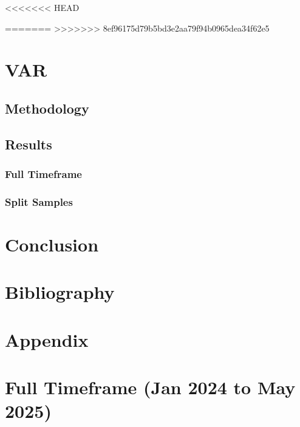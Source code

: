 \documentclass[
]{book}
\begin{document}
\textless\textless\textless\textless\textless\textless\textless{} HEAD

=======
\textgreater\textgreater\textgreater\textgreater\textgreater\textgreater\textgreater{} 8ef96175d79b5bd3e2aa79f94b0965dea34f62e5

\chapter{VAR}\label{var}

\section{Methodology}\label{methodology-1}

\section{Results}\label{results-1}

\subsection{Full Timeframe}\label{full-timeframe-1}

\subsection{Split Samples}\label{split-samples-1}

\chapter{Conclusion}\label{conclusion}

\chapter{Bibliography}\label{bibliography}

\chapter{Appendix}\label{appendix}

\chapter{Full Timeframe (Jan 2024 to May 2025)}\label{full-timeframe-jan-2024-to-may-2025}
\end{document}
